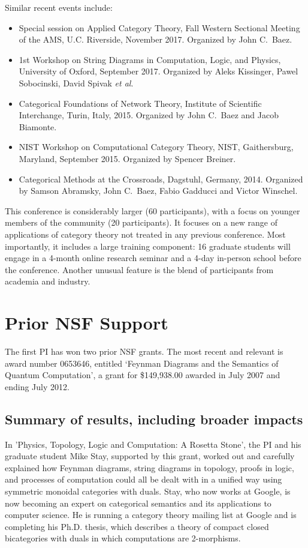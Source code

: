 \documentclass[12pt]{amsart}
\begin{document}
Similar recent events include:

\begin{itemize}
\item Special session on Applied Category Theory, Fall Western Sectional Meeting of the AMS, U.C. Riverside, November 2017.  Organized by John C.\ Baez.
\item  1st Workshop on String Diagrams in Computation, Logic, and Physics, University of Oxford, September 2017.  Organized by Aleks Kissinger, Pawel Sobocinski, David Spivak \textit{et al}.
\item Categorical Foundations of Network Theory, Institute of Scientific Interchange, Turin, Italy, 2015.  Organized by John C.\ Baez and Jacob Biamonte.
\item 
NIST Workshop on Computational Category Theory, NIST, Gaithersburg, Maryland, September 2015.
Organized by Spencer Breiner.
\item 
Categorical Methods at the Crossroads, Dagstuhl, Germany, 2014.   Organized by Samson Abramsky, John C.\ Baez, Fabio Gadducci and Victor Winschel.
\end{itemize}

This conference is considerably larger (60 participants), with a focus on younger members of the community (20 participants).   It focuses on a new range of applications of category theory not treated in any previous conference.  Most importantly, it includes a large training component: 16 graduate students will engage in a 4-month online research seminar and a 4-day in-person school before the conference.  Another unusual feature is the blend of participants from academia and
industry.

\section{Prior NSF Support}

The first PI has won two prior NSF grants.  The most recent and relevant is award number 0653646, entitled `Feynman Diagrams and the Semantics of Quantum Computation', a grant for \$149,938.00 awarded in July 2007 and ending July 2012.   

\subsection{Summary of results, including broader impacts}

In 'Physics, Topology, Logic and Computation: A Rosetta Stone', the PI and his graduate student Mike Stay, supported by this grant, worked out and carefully explained how Feynman diagrams, string diagrams in topology, proofs in logic, and processes of computation could all be dealt with in a unified way using symmetric monoidal categories with duals. Stay, who now works at Google, is now becoming an expert on categorical semantics and its applications to computer science. He is running a category theory mailing list at Google and is completing his Ph.D. thesis, which describes a theory of compact closed bicategories with duals in which computations are 2-morphisms.  
\end{document}
